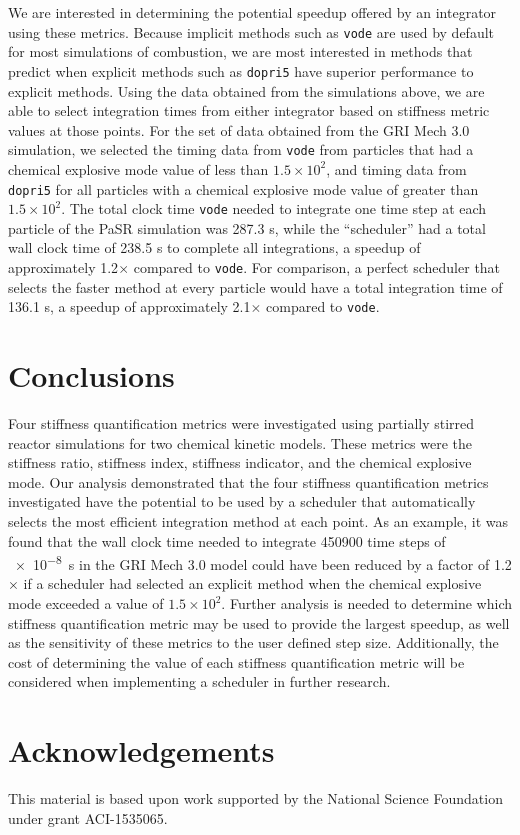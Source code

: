 \documentclass[12pt]{ussci}
\begin{document}
We are interested in determining the potential speedup offered by an integrator using these metrics.
Because implicit methods such as \texttt{vode} are used by default for most simulations of combustion, we are most interested in methods that predict when explicit methods such as \texttt{dopri5} have superior performance to explicit methods.
Using the data obtained from the simulations above, we are able to select integration times from either integrator based on stiffness metric values at those points.
For the set of data obtained from the GRI Mech 3.0 simulation, we selected the timing data from \texttt{vode} from particles that had a chemical explosive mode value of less than $1.5 \times 10^2$, and timing data from \texttt{dopri5} for all particles with a chemical explosive mode value of greater than $1.5 \times 10^2$.
The total clock time \texttt{vode} needed to integrate one time step at each particle of the PaSR simulation was 287.3 s, while the ``scheduler'' had a total wall clock time of 238.5 s to complete all integrations, a speedup of approximately 1.2$\times$ compared to \texttt{vode}.
For comparison, a perfect scheduler that selects the faster method at every particle would have a total integration time of 136.1 s, a speedup of approximately 2.1$\times$ compared to \texttt{vode}.

\section{Conclusions}
Four stiffness quantification metrics were investigated using partially stirred reactor simulations for two chemical kinetic models.
These metrics were the stiffness ratio, stiffness index, stiffness indicator, and the chemical explosive mode.
Our analysis demonstrated that the four stiffness quantification metrics investigated have the potential to be used by a scheduler that automatically selects the most efficient integration method at each point.
As an example, it was found that the wall clock time needed to integrate 450900 time steps of \SI{e-8}{\second} in the GRI Mech 3.0 model could have been reduced by a factor of 1.2$\times$ if a scheduler had selected an explicit method when the chemical explosive mode exceeded a value of $1.5 \times 10^2$.
Further analysis is needed to determine which stiffness quantification metric may be used to provide the largest speedup, as well as the sensitivity of these metrics to the user defined step size.
Additionally, the cost of determining the value of each stiffness quantification metric will be considered when implementing a scheduler in further research.

\section{Acknowledgements}
This material is based upon work supported by the National Science Foundation under grant ACI-1535065.

\setlength{\emergencystretch}{3em}
\printbibliography
\end{document}
